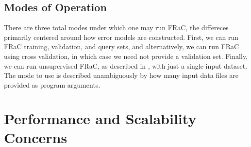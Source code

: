 \documentclass{article}
\begin{document}
\begin{multicols}{2}
\begin{enumerate}
\end{enumerate}

\subsection{Modes of Operation}

There are three total modes under which one may run FRaC, the differeces primarily centered around how error models are constructed.  First, we can run FRaC training, validation, and query sets, and alternatively, we can run FRaC using cross validation, in which case we need not provide a validation set.  Finally, we can run unsupervised FRaC, as described in \cite{FRaC12}, with just a single input dataset.  The mode to use is described unambiguously by how many input data files are provided as program arguments. 

\end{multicols}

\pagebreak[2]

\section{Performance and Scalability Concerns}

\label{sec:scale}
\end{document}
